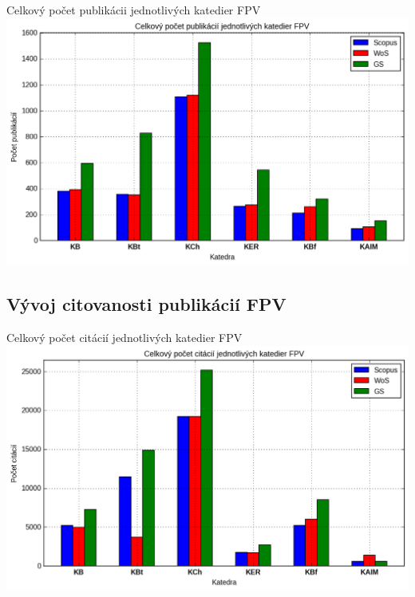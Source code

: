 \documentclass{beamer}
\begin{document}
%
%
\begin{frame}{Celkový počet publikácii jednotlivých katedier FPV}
  \includegraphics[scale=0.5]{plot-results-data-papers.png}
\end{frame}

\subsection{Vývoj citovanosti publikácií FPV}

%
%
\begin{frame}{Celkový počet citácií jednotlivých katedier FPV}
  \includegraphics[scale=0.5]{plot-results-data-citations.png}
\end{frame}
\end{document}
